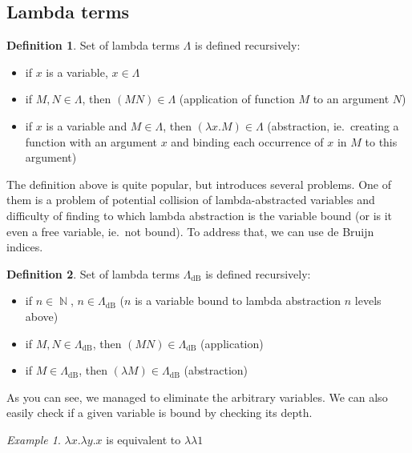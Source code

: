 \documentclass[final]{article}
\theoremstyle{definition}
\newtheorem{definition}{Definition}[subsection]
\theoremstyle{remark}
\newtheorem{example}{Example}[subsection]
\newcommand{\LambdadB}{\ensuremath{\Lambda_{\text{dB}}}}
\DeclareMathOperator{\N}{\mathbb{N}}
\begin{document}
\subsection{Lambda terms}%
\label{sub:lambda_terms}

\begin{definition}
    Set of lambda terms \(\Lambda\) is defined recursively:
    \begin{itemize}
        \item if \(x\) is a variable, \(x \in \Lambda\)
        \item if \(M, N \in \Lambda\), then \((M N) \in \Lambda\) (application of function \(M\) to an argument \(N\))
        \item if \(x\) is a variable and \(M \in \Lambda\), then \((\lambda x . M) \in \Lambda\) (abstraction, ie.\ creating a function with an argument \(x\) and binding each occurrence of \(x\) in \(M\) to this argument)
    \end{itemize}
\end{definition}

The definition above is quite popular, but introduces several problems. One of them is a problem of potential collision of lambda-abstracted variables and difficulty of finding to which lambda abstraction is the variable bound (or is it even a free variable, ie.\ not bound). To address that, we can use de Bruijn indices.

\begin{definition}
    Set of lambda terms \(\LambdadB\) is defined recursively:
    \begin{itemize}
        \item if \(n \in \N\), \(n \in \LambdadB\) (\(n\) is a variable bound to lambda abstraction \(n\) levels above)
        \item if \(M, N \in \LambdadB\), then \((M N) \in \LambdadB\) (application)
        \item if \(M \in \LambdadB\), then \((\lambda M) \in \LambdadB\) (abstraction)
    \end{itemize}
\end{definition}

As you can see, we managed to eliminate the arbitrary variables. We can also easily check if a given variable is bound by checking its depth.

\begin{example}
    \(\lambda x . \lambda y . x\) is equivalent to \(\lambda \lambda 1\)
\end{example}
\end{document}
